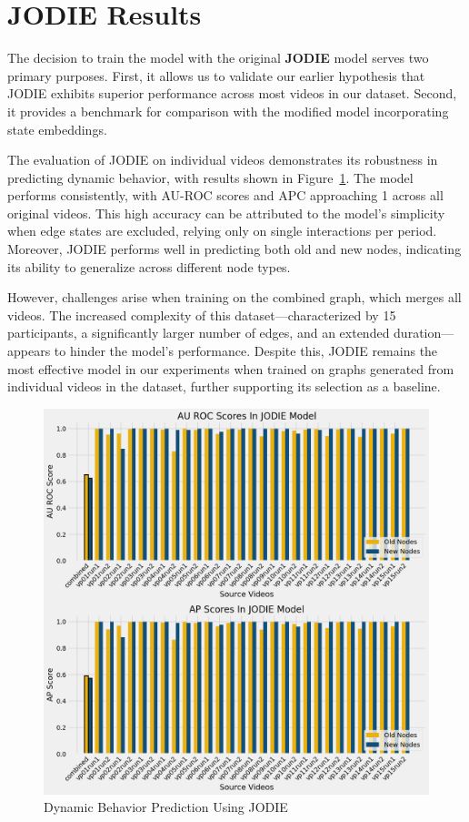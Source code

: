\section{JODIE Results}


The decision to train the model with the original \textbf{JODIE} model serves two primary purposes. First, it allows us to validate our earlier hypothesis that JODIE exhibits superior performance across most videos in our dataset. Second, it provides a benchmark for comparison with the modified model incorporating state embeddings.

The evaluation of JODIE on individual videos demonstrates its robustness in predicting dynamic behavior, with results shown in Figure~\ref{fig:JODIE_results}. The model performs consistently, with AU-ROC scores and APC approaching 1 across all original videos. This high accuracy can be attributed to the model's simplicity when edge states are excluded, relying only on single interactions per period. Moreover, JODIE performs well in predicting both old and new nodes, indicating its ability to generalize across different node types.

However, challenges arise when training on the combined graph, which merges all videos. The increased complexity of this dataset—characterized by 15 participants, a significantly larger number of edges, and an extended duration—appears to hinder the model's performance. Despite this, JODIE remains the most effective model in our experiments when trained on graphs generated from individual videos in the dataset, further supporting its selection as a baseline.



\begin{figure}
    \centering
    \includegraphics[width=\textwidth]{figures/05_JODIE.png}
    \caption{Dynamic Behavior Prediction Using JODIE}
    \label{fig:JODIE_results}
\end{figure}

